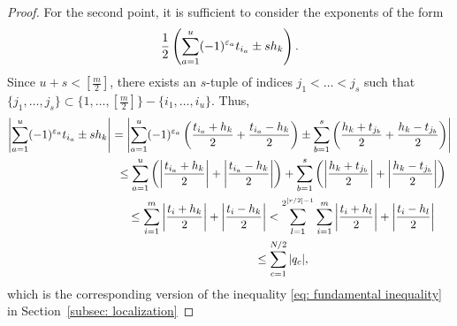 \documentclass[10pt,a4paper]{amsart}
\numberwithin{equation}{section}
\begin{document}
\begin{proof}
For the second point, it is suf\/f\/icient to consider the exponents of the form
 \begin{gather*}{1\over 2}\left(\sum_{a=1}^u (-1)^{\varepsilon_a}t_{i_a}\pm sh_k\right).\end{gather*}
Since $u+s<[\frac{m}{2}]$, there exists an $s$-tuple of indices $j_1<\dots < j_s$ such that $\{j_1,\dots, j_s\}\subset \{1,\dots,[\frac{m}{2}]\}-\{i_1,\dots,i_u\}$. Thus,
 \begin{gather*}
 \left\vert\sum_{a=1}^u (-1)^{\varepsilon_a}t_{i_a}\pm sh_k\right\vert =
 \left\vert\sum_{a=1}^u (-1)^{\varepsilon_a}\left({t_{i_a}+h_k\over 2}+{t_{i_a}-h_k\over 2}\right)
 \pm \sum_{b=1}^s \left({h_k+t_{j_b}\over 2}+{h_k-t_{j_b}\over 2}\right) \right\vert\\
 \hphantom{\left\vert\sum_{a=1}^u (-1)^{\varepsilon_a}t_{i_a}\pm sh_k\right\vert}{}
 \leq\sum_{a=1}^u
 \left(\left\vert{t_{i_a}+h_k\over 2}\right\vert+\left\vert{t_{i_a}-h_k\over 2}\right\vert\right)
 + \sum_{b=1}^s \left(\left\vert{h_k+t_{j_b}\over 2}\right\vert+\left\vert{h_k-t_{j_b}\over 2}\right\vert\right)\\
\hphantom{\left\vert\sum_{a=1}^u (-1)^{\varepsilon_a}t_{i_a}\pm sh_k\right\vert}{} \leq\sum_{i=1}^m
 \left|{t_{i}+h_k\over 2}\right|+\left|{t_{i}-h_k\over 2}\right|
<\sum_{l=1}^{2^{[r/2]-1}}\sum_{i=1}^m
 \left|{t_{i}+h_l\over 2}\right|+\left|{t_{i}-h_l\over 2}\right|\\
\hphantom{\left\vert\sum_{a=1}^u (-1)^{\varepsilon_a}t_{i_a}\pm sh_k\right\vert}{} \leq \sum_{c=1}^{N/2} |q_c|,
 \end{gather*}
which is the corresponding version of the inequality \eqref{eq: fundamental inequality} in Section~\ref{subsec: localization}
\end{proof}
\end{document}
